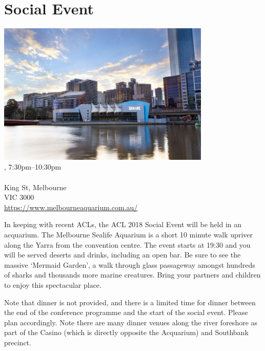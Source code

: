 \clearpage
\section[Social Event: \daydate, 7:30pm]{Social Event}
\setheaders{}{\daydateyear}

\begin{center}

\includegraphics[width=4in]{content/day2/aquarium.jpg} \\


\daydateyear, 7:30pm--10:30pm \vspace{1em}\\
\SocialLoc\\
King St, Melbourne \\
VIC 3000 \\
\url{https://www.melbourneaquarium.com.au/}
\end{center}

In keeping with recent ACLs, the ACL 2018 Social Event will be held in an
acquarium.  The Melbourne Sealife Aquarium is a short 10 minute walk upriver
along the Yarra from the convention centre. The event starts at 19:30 and you
will be served deserts and drinks, including an open bar.  Be sure to see the
massive `Mermaid Garden', a walk through glass passageway amongst hundreds of
sharks and thousands more marine creatures. Bring your partners and children 
to enjoy this spectacular place.

Note that dinner is not provided, and there is a limited time for dinner
between the end of the conference programme and the start of the social event.
Please plan accordingly.  Note there are many dinner venues along the river
foreshore as part of the Casino (which is directly opposite the Acquarium) and
Southbank precinct.
